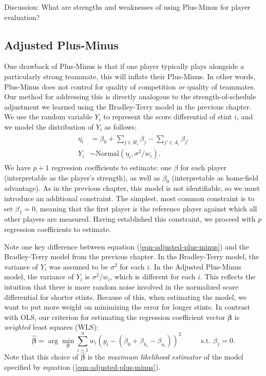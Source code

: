 \documentclass{article}
\begin{document}
  \begin{framed}
    {\sc Discussion:} What are strengths and weaknesses of using Plus-Minus for player evaluation?
  \end{framed}

  \subsection{\sc Adjusted Plus-Minus}

  One drawback of Plus-Minus is that if one player typically plays alongside a particularly strong teammate, this will inflate their Plus-Minus. In other words, Plus-Minus does not control for quality of competition {\it or} quality of teammates. Our method for addressing this is directly analogous to the strength-of-schedule adjustment we learned using the Bradley-Terry model in the previous chapter. We use the random variable $Y_i$ to represent the score differential of stint $i$, and we model the distribution of $Y_i$ as follows:
  \begin{align}
    \label{eqn-adjusted-plus-minus}
    \begin{split}
      \eta_i &= \beta_0 + \sum_{j \in H_i}\beta_{j} - \sum_{j' \in A_i}\beta_{j'}\\
      Y_i &\sim \mbox{Normal}(\eta_i, \sigma^2 / w_i).
    \end{split}
  \end{align}
  We have $p + 1$ regression coefficients to estimate: one $\beta$ for each player (interpretable as the player's strength), as well as $\beta_0$ (interpretable as home-field advantage). As in the previous chapter, this model is not identifiable, so we must introduce an additional constraint. The simplest, most common constraint is to set $\beta_1 = 0$, meaning that the first player is the reference player against which all other players are measured. Having established this constraint, we proceed with $p$ regression coefficients to estimate.

  Note one key difference between equation (\ref{eqn-adjusted-plus-minus}) and the Bradley-Terry model from the previous chapter. In the Bradley-Terry model, the variance of $Y_i$ was assumed to be $\sigma^2$ for each $i$. In the Adjusted Plus-Minus model, the variance of $Y_i$ is $\sigma^2 / w_i$, which is different for each $i$. This reflects the intuition that there is more random noise involved in the normalized score differential for shorter stints. Because of this, when estimating the model, we want to put more weight on minimizing the error for longer stints. In contrast with OLS, our criterion for estimating the regression coefficient vector $\boldsymbol{\beta}$ is {\it weighted} least squares (WLS):
  \begin{equation}
    \label{eqn-weighted-squares}
    \boldsymbol{\hat\beta} = \arg\min_{\boldsymbol{\beta}} \sum_{i=1}^n w_i (y_i - (\beta_0 + \beta_{h_i} - \beta_{a_i}))^2 \hspace{1cm} \mbox{ s.t. } \beta_1 = 0.
  \end{equation}
  Note that this choice of $\boldsymbol{\hat\beta}$ is the {\it maximum likelihood estimator} of the model specified by equation (\ref{eqn-adjusted-plus-minus}).
\end{document}
